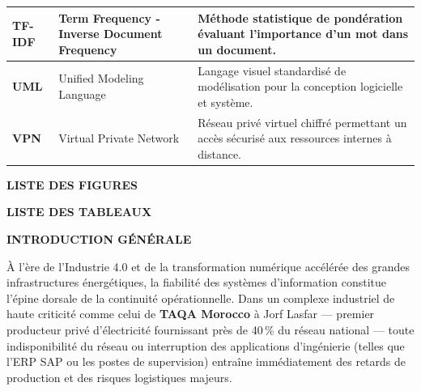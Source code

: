 \documentclass[12pt, a4paper, oneside]{report}
\begin{document}
\begin{longtable}{|p{2.4cm}|p{5.4cm}|p{7.4cm}|}
\hline
\textbf{TF-IDF} & Term Frequency - Inverse Document Frequency & Méthode statistique de pondération évaluant l'importance d'un mot dans un document. \\
\hline
\textbf{UML} & Unified Modeling Language & Langage visuel standardisé de modélisation pour la conception logicielle et système. \\
\hline
\textbf{VPN} & Virtual Private Network & Réseau privé virtuel chiffré permettant un accès sécurisé aux ressources internes à distance. \\
\hline
\end{longtable}

\newpage
{}
\begin{flushright}
  \textbf{\Large LISTE DES FIGURES}
\end{flushright}

\vspace{0.6cm}

\listoffigures

\newpage
{}
\begin{flushright}
  \textbf{\Large LISTE DES TABLEAUX}
\end{flushright}

\vspace{0.6cm}

\listoftables

\newpage
{}
\begin{flushright}
  \textbf{\Large INTRODUCTION GÉNÉRALE}
\end{flushright}

\vspace{0.8cm}

À l'ère de l'Industrie 4.0 et de la transformation numérique accélérée des grandes infrastructures énergétiques, la fiabilité des systèmes d'information constitue l'épine dorsale de la continuité opérationnelle. Dans un complexe industriel de haute criticité comme celui de \textbf{TAQA Morocco} à Jorf Lasfar --- premier producteur privé d'électricité fournissant près de 40\,\% du réseau national --- toute indisponibilité du réseau ou interruption des applications d'ingénierie (telles que l'ERP SAP ou les postes de supervision) entraîne immédiatement des retards de production et des risques logistiques majeurs.
\end{document}
